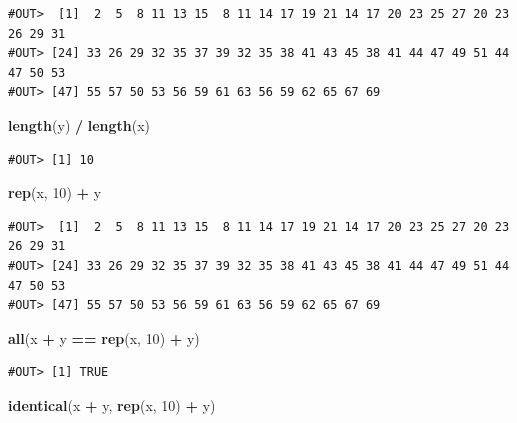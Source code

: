 \documentclass[]{book}
\newenvironment{Shaded}{\begin{snugshade}}{\end{snugshade}}
\newcommand{\KeywordTok}[1]{\textcolor[rgb]{0.13,0.29,0.53}{\textbf{#1}}}
\newcommand{\DecValTok}[1]{\textcolor[rgb]{0.00,0.00,0.81}{#1}}
\newcommand{\StringTok}[1]{\textcolor[rgb]{0.31,0.60,0.02}{#1}}
\newcommand{\OperatorTok}[1]{\textcolor[rgb]{0.81,0.36,0.00}{\textbf{#1}}}
\newcommand{\NormalTok}[1]{#1}
\theoremstyle{definition}
\theoremstyle{definition}
\theoremstyle{definition}
\theoremstyle{remark}
\begin{document}
\begin{verbatim}
#OUT>  [1]  2  5  8 11 13 15  8 11 14 17 19 21 14 17 20 23 25 27 20 23 26 29 31
#OUT> [24] 33 26 29 32 35 37 39 32 35 38 41 43 45 38 41 44 47 49 51 44 47 50 53
#OUT> [47] 55 57 50 53 56 59 61 63 56 59 62 65 67 69
\end{verbatim}

\begin{Shaded}
\begin{Highlighting}[]
\KeywordTok{length}\NormalTok{(y) }\OperatorTok{/}\StringTok{ }\KeywordTok{length}\NormalTok{(x)}
\end{Highlighting}
\end{Shaded}

\begin{verbatim}
#OUT> [1] 10
\end{verbatim}

\begin{Shaded}
\begin{Highlighting}[]
\KeywordTok{rep}\NormalTok{(x, }\DecValTok{10}\NormalTok{) }\OperatorTok{+}\StringTok{ }\NormalTok{y}
\end{Highlighting}
\end{Shaded}

\begin{verbatim}
#OUT>  [1]  2  5  8 11 13 15  8 11 14 17 19 21 14 17 20 23 25 27 20 23 26 29 31
#OUT> [24] 33 26 29 32 35 37 39 32 35 38 41 43 45 38 41 44 47 49 51 44 47 50 53
#OUT> [47] 55 57 50 53 56 59 61 63 56 59 62 65 67 69
\end{verbatim}

\begin{Shaded}
\begin{Highlighting}[]
\KeywordTok{all}\NormalTok{(x }\OperatorTok{+}\StringTok{ }\NormalTok{y }\OperatorTok{==}\StringTok{ }\KeywordTok{rep}\NormalTok{(x, }\DecValTok{10}\NormalTok{) }\OperatorTok{+}\StringTok{ }\NormalTok{y)}
\end{Highlighting}
\end{Shaded}

\begin{verbatim}
#OUT> [1] TRUE
\end{verbatim}

\begin{Shaded}
\begin{Highlighting}[]
\KeywordTok{identical}\NormalTok{(x }\OperatorTok{+}\StringTok{ }\NormalTok{y, }\KeywordTok{rep}\NormalTok{(x, }\DecValTok{10}\NormalTok{) }\OperatorTok{+}\StringTok{ }\NormalTok{y)}
\end{Highlighting}
\end{Shaded}
\end{document}
